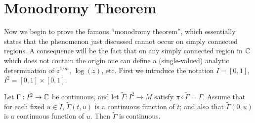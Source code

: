 \documentclass[a4paper,11pt]{article}
\begin{document}
\section{Monodromy Theorem}
Now we begin to prove the famous ``monodromy theorem'', which
essentially states that the phenomenon just discussed cannot occur on
simply connected regions.  A consequence will be the fact that on any
simply connected region in ${\mathbb C}$ which does not contain the origin
one can define a (single-valued) analytic determination of $z^{1/m}$,
$\log(z)$, etc.   First we introduce the notation $I = [0,1]$, $I^2 =
[0,1] \times [0,1]$.

\begin{lem}
  \label{lem:1}
  Let $\Gamma : I^2 \to {\mathbb C}$ be continuous, and let
  $\widetilde{\Gamma} : I^2 \to M$ satisfy $\pi \circ
  \widetilde{\Gamma} = \Gamma$.  Assume that for each fixed $u \in I$,
  $\widetilde{\Gamma}(t,u)$ is a continuous function of $t$; and also
  that $\widetilde{\Gamma}(0,u)$ is a continuous function of $u$.
  Then $\widetilde{\Gamma}$ is continuous.
\end{lem}
\end{document}
